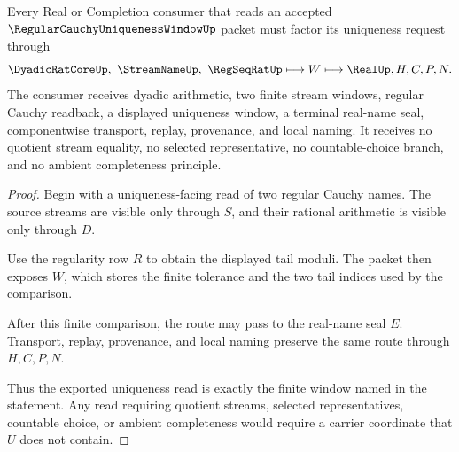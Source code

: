 \begin{theorem}
\label{thm:regular-cauchy-uniqueness-window-route}
Every Real or Completion consumer that reads an accepted $\RegularCauchyUniquenessWindowUp$ packet must factor its uniqueness request through
$$
\DyadicRatCoreUp,\ \StreamNameUp,\ \RegSeqRatUp
\longmapsto
W
\longmapsto
\RealUp,H,C,P,N .
$$
The consumer receives dyadic arithmetic, two finite stream windows, regular Cauchy readback, a displayed uniqueness window, a terminal real-name seal, componentwise transport, replay, provenance, and local naming. It receives no quotient stream equality, no selected representative, no countable-choice branch, and no ambient completeness principle.
\end{theorem}
\begin{proof}
Begin with a uniqueness-facing read of two regular Cauchy names. The source streams are visible only through $S$, and their rational arithmetic is visible only through $D$.

Use the regularity row $R$ to obtain the displayed tail moduli. The packet then exposes $W$, which stores the finite tolerance and the two tail indices used by the comparison.

After this finite comparison, the route may pass to the real-name seal $E$. Transport, replay, provenance, and local naming preserve the same route through $H,C,P,N$.

Thus the exported uniqueness read is exactly the finite window named in the statement. Any read requiring quotient streams, selected representatives, countable choice, or ambient completeness would require a carrier coordinate that $U$ does not contain.
\end{proof}



